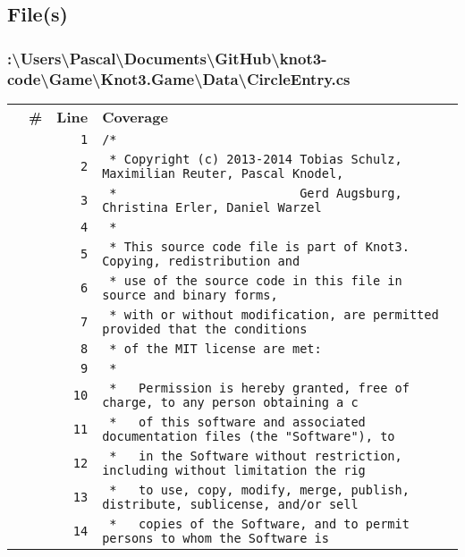 \documentclass[a4paper,10pt]{article}
\begin{document}
\subsection{File(s)}
\subsubsection{:\textbackslash Users\textbackslash Pascal\textbackslash Documents\textbackslash GitHub\textbackslash knot3-code\textbackslash Game\textbackslash Knot3.Game\textbackslash Data\textbackslash CircleEntry.cs}
\begin{longtable}[l]{lrrl}
\textbf{} & \textbf{\#} & \textbf{Line} & \textbf{Coverage}\\
\cellcolor{gray} &  & \verb~1~ & \verb~/*~\\
\cellcolor{gray} &  & \verb~2~ & \verb~ * Copyright (c) 2013-2014 Tobias Schulz, Maximilian Reuter, Pascal Knodel,~\\
\cellcolor{gray} &  & \verb~3~ & \verb~ *                         Gerd Augsburg, Christina Erler, Daniel Warzel~\\
\cellcolor{gray} &  & \verb~4~ & \verb~ *~\\
\cellcolor{gray} &  & \verb~5~ & \verb~ * This source code file is part of Knot3. Copying, redistribution and~\\
\cellcolor{gray} &  & \verb~6~ & \verb~ * use of the source code in this file in source and binary forms,~\\
\cellcolor{gray} &  & \verb~7~ & \verb~ * with or without modification, are permitted provided that the conditions~\\
\cellcolor{gray} &  & \verb~8~ & \verb~ * of the MIT license are met:~\\
\cellcolor{gray} &  & \verb~9~ & \verb~ *~\\
\cellcolor{gray} &  & \verb~10~ & \verb~ *   Permission is hereby granted, free of charge, to any person obtaining a c~\\
\cellcolor{gray} &  & \verb~11~ & \verb~ *   of this software and associated documentation files (the "Software"), to ~\\
\cellcolor{gray} &  & \verb~12~ & \verb~ *   in the Software without restriction, including without limitation the rig~\\
\cellcolor{gray} &  & \verb~13~ & \verb~ *   to use, copy, modify, merge, publish, distribute, sublicense, and/or sell~\\
\cellcolor{gray} &  & \verb~14~ & \verb~ *   copies of the Software, and to permit persons to whom the Software is~\\

\end{longtable}
\end{document}
